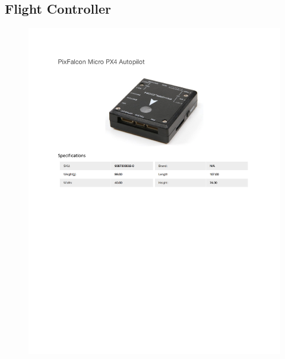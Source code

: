 \documentclass[../main.tex]{subfiles}
\begin{document}
\subsection{Flight Controller \cite{FlightController}} \label{PIXFalcon}
\begin{figure}[H]
	\centering
	\includegraphics[width=\textwidth]{img/specs/flight_controller.pdf}
\end{figure}
\end{document}
